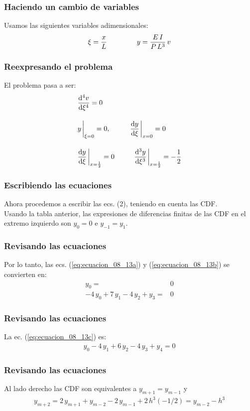 \documentclass[12pt]{beamer}
\begin{document}
\begin{frame}
\frametitle{Haciendo un cambio de variables}
Usamos las siguientes variables adimensionales:
\\
\bigskip
\pause
\begin{align*}
\xi = \dfrac{x}{L} \hspace{1.5cm} y = \dfrac{E \, I}{P \, L^{3}} \, v
\end{align*}
\end{frame}
\begin{frame}
\frametitle{Reexpresando el problema}
El problema pasa a ser:
\pause
\begin{align*}
&\dv[4]{v}{\xi} = 0 \\[1em]
&y \eval_{\xi=0} = 0, \hspace{1cm} \dv{y}{\xi} \eval_{x=0} = 0 \\[1em]
&\dv{y}{\xi} \eval_{x=\frac{1}{2}} = 0 \hspace{1cm} \dv[3]{y}{\xi} \eval_{x=\frac{1}{2}} = -\dfrac{1}{2}
\end{align*}    
\end{frame}
\begin{frame}
\frametitle{Escribiendo las ecuaciones}
Ahora procedemos a escribir las ecs. (2), teniendo en cuenta las CDF.
\\
\bigskip
\pause
Usando la tabla anterior, las expresiones de diferencias finitas de las CDF en el extremo izquierdo son $y_{0} = 0$ e $y_{-1} = y_{1}$.
\end{frame}
\begin{frame}
\frametitle{Revisando las ecuaciones}
Por lo tanto, las ecs. (\ref{eq:ecuacion_08_13a}) y (\ref{eq:ecuacion_08_13b}) se convierten en:
\pause
\begin{subequations}
\begin{align}
y_{0} =& 0 \label{eq:ecuacion_a} \tag{a} \\
- 4 \, y_{0} + 7 \, y_{1} - 4 \, y_{2} + y_{3} =& 0 \label{eq:ecuacion_b} \tag{b}
\end{align}
\end{subequations}
\end{frame}
\begin{frame}
\frametitle{Revisando las ecuaciones}
La ec. (\ref{eq:ecuacion_08_13c}) es:
\pause
\begin{align}
y_{0} - 4 \, y_{1} + 6 \, y_{2} - 4 \, y_{3} + y_{4} = 0 \label{eq:ecuacion_c} \tag{c}
\end{align}
\end{frame}
\begin{frame}
\frametitle{Revisando las ecuaciones}
Al lado derecho las CDF son equivalentes a $y_{m+1} = y_{m-1}$ y
\begin{align*}
y_{m+2} = 2 \, y_{m+1} + y_{m-2} - 2 \, y_{m-1} + 2 \, h^{3} (-1/2) = y_{m-2} - h^{3}
\end{align*}
\end{frame}
\end{document}
